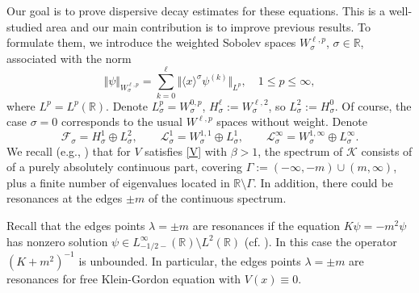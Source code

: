 \documentclass[reqno]{amsart}
\newcommand{\R}{{\mathbb R}}
\newcommand{\cL}{{\mathcal L}}
\newcommand{\cF}{{\mathcal F}}
\newcommand{\cK}{{\mathcal K}}
\numberwithin{equation}{section}
\begin{document}
Our goal is to prove dispersive decay estimates for these equations. This is a well-studied
area and  our main contribution is to improve previous results. 
To formulate them, we introduce the weighted  Sobolev spaces $W^{\ell,p}_{\sigma}$, $\sigma\in\R$, associated with the norm
\begin{equation*}
   \Vert \psi\Vert_{W^{\ell,p}_{\sigma}}=  \sum\limits_{k=0}^\ell\Vert\langle x\rangle^{\sigma}\psi^{(k)}\Vert_{L^{p}}, \quad 1\le p \le\infty,
 \end{equation*}
where $L^p=L^p(\R)$. Denote $L^p_\sigma=W^{0,p}_\sigma$,
$H^\ell_\sigma:=W^{\ell,2}_\sigma$, so $L^2_\sigma:=H^0_\sigma$.
Of course, the case $\sigma=0$ corresponds to the usual $W^{\ell,p}$ spaces without weight.
Denote
$$
{\cF}_{\sigma}=H^1_\sigma\oplus L^2_\sigma,\qquad \cL^1_{\sigma}=W^{1,1}_\sigma\oplus L^1_{\sigma},
\qquad \cL^{\infty}_{\sigma}=W^{1,\infty}_\sigma\oplus L^\infty_{\sigma}. 
$$
We recall (e.g., \cite{KK12} ) that for $V$ satisfies \eqref{V} with $\beta>1$, the spectrum of  $\cK$ consists of 
of a purely absolutely continuous part, covering $\Gamma:=(-\infty,-m)\cup (m,\infty)$, plus a finite number of eigenvalues located in $\R\setminus\Gamma$. 
In addition, there could be resonances at the edges $\pm m$ of the continuous spectrum.

Recall that the edges points $\lambda=\pm m$ are resonances if the equation $K\psi=-m^2\psi$ has nonzero solution
$\psi\in L^\infty_{-1/2-} (\R)\setminus L^2(\R)$ (cf. \cite{M}). In this case the operator $(K+m^2)^{-1}$ is unbounded.
In particular, the edges points $\lambda=\pm m$ are resonances for free Klein-Gordon equation with $V(x)\equiv 0$.
\end{document}
